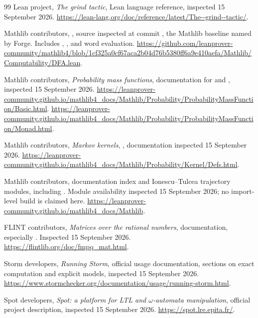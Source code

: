 \begin{thebibliography}{99}
Lean project, \emph{The grind tactic}, Lean language reference, inspected
15 September 2026.
\url{https://lean-lang.org/doc/reference/latest/The--grind--tactic/}.

Mathlib contributors, , source inspected at
commit , the Mathlib baseline
named by Forge. Includes , , and word evaluation.
\url{https://github.com/leanprover-community/mathlib4/blob/1cf325a0cf67aca2b04d76b5380ff6a9e410aefa/Mathlib/Computability/DFA.lean}.

Mathlib contributors, \emph{Probability mass functions}, documentation for
 and
, inspected
15 September 2026.
\url{https://leanprover-community.github.io/mathlib4_docs/Mathlib/Probability/ProbabilityMassFunction/Basic.html}.
\url{https://leanprover-community.github.io/mathlib4_docs/Mathlib/Probability/ProbabilityMassFunction/Monad.html}.

Mathlib contributors, \emph{Markov kernels},
, documentation inspected
15 September 2026.
\url{https://leanprover-community.github.io/mathlib4_docs/Mathlib/Probability/Kernel/Defs.html}.

Mathlib contributors, documentation index and Ionescu--Tulcea trajectory
modules, including .
Module availability inspected 15 September 2026; no import-level build is
claimed here.
\url{https://leanprover-community.github.io/mathlib4_docs/Mathlib}.

FLINT contributors, \emph{Matrices over the rational numbers},
 documentation, especially .
Inspected 15 September 2026.
\url{https://flintlib.org/doc/fmpq_mat.html}.

Storm developers, \emph{Running Storm}, official usage documentation,
sections on exact computation and explicit models, inspected
15 September 2026.
\url{https://www.stormchecker.org/documentation/usage/running-storm.html}.

Spot developers, \emph{Spot: a platform for LTL and $\omega$-automata
manipulation}, official project description, inspected 15 September 2026.
\url{https://spot.lre.epita.fr/}.

\end{thebibliography}
